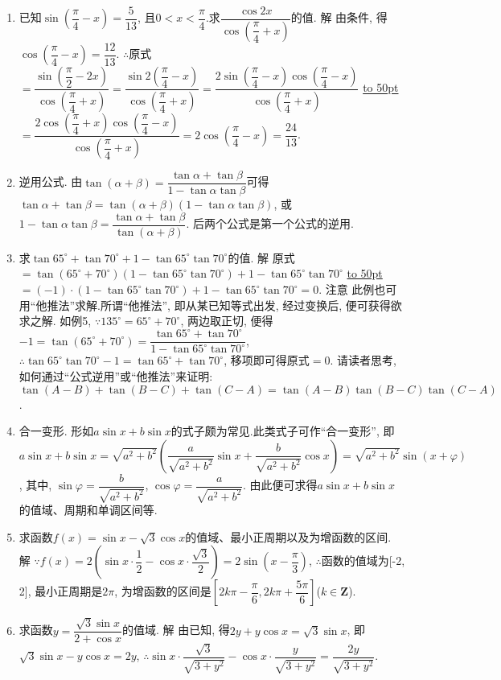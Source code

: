 \documentclass[10pt,a4paper]{article}
\newcommand{\blank}[1]{\underline{\hbox to #1pt{}}}
\begin{document}
\begin{enumerate}[1.]
\item 已知$\sin (\dfrac{\pi }4-x)=\dfrac 5{13}$, 且$0<x<\dfrac{\pi }4$.求$\dfrac{\cos 2x}{\cos (\dfrac{\pi }4+x)}$的值.
解  由条件, 得$\cos (\dfrac\pi 4-x)=\dfrac {12}{13}$.
$\therefore$原式$=\dfrac{\sin (\dfrac{\pi }2-2x)}{\cos (\dfrac{\pi }4+x)}=\dfrac{\sin 2(\dfrac{\pi }4-x)}{\cos (\dfrac{\pi }4+x)}=\dfrac{2\sin (\dfrac{\pi }4-x)\cos (\dfrac{\pi }4-x)}{\cos (\dfrac{\pi }4+x)}$
\blank{50}$=\dfrac{2\cos (\dfrac\pi 4+x)\cos (\dfrac{\pi }4-x)}{\cos (\dfrac{\pi }4+x)}=2\cos (\dfrac{\pi }4-x)=\dfrac {24}{13}$.
\item 逆用公式.
由$\tan (\alpha +\beta)=\dfrac{\tan \alpha +\tan \beta }{1-\tan \alpha \tan \beta }$可得
$\tan \alpha +\tan \beta =\tan (\alpha +\beta)(1-\tan \alpha \tan \beta)$, 或$1-\tan \alpha \tan \beta =\dfrac{\tan \alpha +\tan \beta }{\tan (\alpha +\beta)}$.
后两个公式是第一个公式的逆用.
\item 求$\tan 65^\circ +\tan 70^\circ +1-\tan 65^\circ \tan 70^\circ$的值.
解  原式$=\tan (65^\circ +70^\circ)(1-\tan 65^\circ \tan 70^\circ)+1-\tan 65^\circ \tan 70^\circ$
\blank{50}$=(-1)\cdot (1-\tan 65^\circ \tan 70^\circ)+1-\tan 65^\circ \tan 70^\circ =0$.
注意  此例也可用``他推法''求解.所谓``他推法'', 即从某已知等式出发, 经过变换后, 便可获得欲求之解.
如例5, $\because 135^\circ =65^\circ +70^\circ$, 两边取正切, 便得$-1=\tan (65^\circ +70^\circ)=\dfrac{\tan 65^\circ +\tan 70^\circ }{1-\tan 65^\circ \tan 70^\circ }$,
$\therefore \tan 65^\circ \tan 70^\circ -1=\tan 65^\circ +\tan 70^\circ$, 移项即可得原式$=0$.
请读者思考, 如何通过``公式逆用''或``他推法''来证明:
$\tan (A-B)+\tan (B-C)+\tan (C-A)=\tan (A-B)\tan (B-C)\tan (C-A)$.
\item 合一变形.
形如$a\sin x+b\sin x$的式子颇为常见.此类式子可作``合一变形'', 即
$a\sin x+b\sin x=\sqrt {a^2+b^2}(\dfrac a{\sqrt {a^2+b^2}}\sin x+\dfrac b{\sqrt {a^2+b^2}}\cos x)=\sqrt {a^2+b^2}\sin (x+\varphi)$,
其中, $\sin \varphi =\dfrac b{\sqrt {a^2+b^2}}$, $\cos \varphi =\dfrac a{\sqrt {a^2+b^2}}$.
由此便可求得$a\sin x+b\sin x$的值域、周期和单调区间等.
\item 求函数$f(x)=\sin x-\sqrt 3\cos x$的值域、最小正周期以及为增函数的区间.
解  $\because f(x)=2(\sin x\cdot \dfrac 12-\cos x\cdot \dfrac{\sqrt 3}2)=2\sin (x-\dfrac{\pi }3)$,
$\therefore$函数的值域为[-2, 2], 最小正周期是$2\pi$, 为增函数的区间是$[2k\pi -\dfrac{\pi }6,2k\pi +\dfrac{5\pi }6]$($k\in \mathbf{Z}$).
\item 求函数$y=\dfrac{\sqrt 3\sin x}{2+\cos x}$的值域.
解  由已知, 得$2y+y\cos x=\sqrt 3\sin x$, 即$\sqrt 3\sin x-y\cos x=2y$,
$\therefore \sin x\cdot \dfrac{\sqrt 3}{\sqrt {3+y^2}}-\cos x\cdot \dfrac y{\sqrt {3+y^2}}=\dfrac{2y}{\sqrt {3+y^2}}$.

\end{enumerate}
\end{document}
